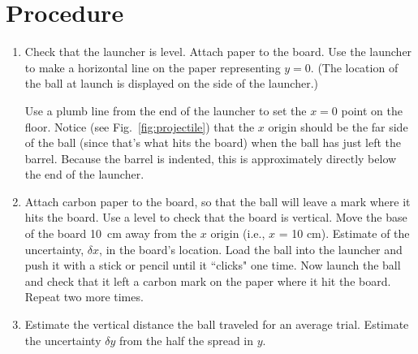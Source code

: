 \section*{Procedure}
\begin{enumerate}

\item Check that the launcher is level. Attach paper to the board.  Use the launcher to make a horizontal line
on the paper representing $y = 0$. (The location of the ball at launch is displayed
on the side of the launcher.)

Use a plumb line from the end of the launcher to set the $x = 0$ point on the
floor.  Notice (see Fig.~\ref{fig:projectile}) that the $x$ origin 
should be the far side of the ball (since that's what hits the board) when the ball
has just left the barrel.  Because the barrel is indented, this is approximately
directly below the end of the launcher.


\item  Attach carbon paper to the board, so that the ball will leave a mark where
it hits the board. Use a level to check that the board is vertical.
Move the base of the board 10~cm away from the $x$ origin (i.e., $x$ = 10 cm).
Estimate of the
uncertainty, $\delta x$, in the board's location.
Load the ball into the launcher and push it with a stick or pencil until
it ``clicks" one time.
Now launch the ball and check that it
left a carbon mark on the paper where it hit the board.  Repeat two more times. 

\item  Estimate the vertical distance
the ball traveled for an average trial.  Estimate the uncertainty $\delta y$ from the
half the spread in $y$.


\end{enumerate}
